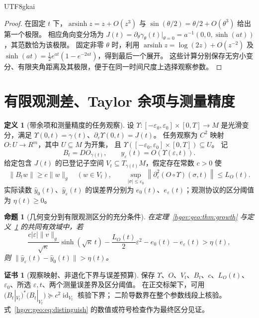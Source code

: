 \documentclass[12pt,a4paper,openany,notitlepage]{report}
\theoremstyle{plain}
\newtheorem{proposition}[theorem]{命题}
\theoremstyle{definition}
\newtheorem{definition}[theorem]{定义}
\newtheorem*{certificate}{证书}
\theoremstyle{remark}
\def\mathcal#1{#1}\def\mathsf#1{#1}\def\mathbb#1{#1}%
\begin{document}
\begin{CJK*}{UTF8}{gkai}
\begin{proof}
在固定 $t$ 下，$\operatorname{arsinh}z=z+O(z^3)$ 与
$\sin(\theta/2)=\theta/2+O(\theta^3)$ 给出第一个极限。
相应角向变分场为
$J(t)=\partial_\theta\gamma_\theta(t)|_{\theta=0}
=a^{-1}(0,0,\sinh(at))$，其范数恰为该极限。
固定非零 $\theta$ 时，利用
$\operatorname{arsinh}z=\log(2z)+O(z^{-2})$ 及
$\sinh(at)=\tfrac12e^{at}(1-e^{-2at})$，得到最后一个展开。
这些计算分别保存无穷小变分、有限夹角距离及其极限，便于在同一时间尺度上选择观察参数。
\end{proof}

\section{有限观测差、Taylor 余项与测量精度}
\label{exp:geo:section:finite-observation}

\begin{definition}[带余项和测量精度的任务观察]
\label{hgov:geo:def:observation}
设 $\Upsilon:[-\varepsilon_0,\varepsilon_0]\times[0,T]\to M$ 是光滑变分，满足
$\Upsilon(0,t)=\gamma(t)$、$\partial_\varepsilon\Upsilon(0,t)=J(t)$。
任务观察为 $C^2$ 映射 $\mathcal O:U\to\mathbb R^m$，其中 $U\subseteq M$ 为开集，
且 $\Upsilon([-\varepsilon_0,\varepsilon_0]\times[0,T])\subseteq U$。
记
\[
B_t=D\mathcal O_{\gamma(t)},\qquad
y_\varepsilon(t)=\mathcal O(\Upsilon(\varepsilon,t)).
\]
给定包含 $J(t)$ 的已登记子空间 $V_t\subseteq T_{\gamma(t)}M$，假定存在常数 $c>0$ 使
\[
\lVert B_tw\rVert\ge c\lVert w\rVert_g
\quad(w\in V_t),\qquad
\sup_{|\sigma|\le\varepsilon_0}
\left\lVert\partial_\varepsilon^2
(\mathcal O\circ\Upsilon)(\sigma,t)\right\rVert\le L_{\mathcal O}(t).
\]
实际读数 $\widehat y_0(t)$、$\widehat y_\varepsilon(t)$ 的误差界分别为
$e_0(t)$、$e_\varepsilon(t)$；观测协议的区分阈值为 $\eta(t)\ge0$。
\end{definition}

\begin{proposition}[几何变分到有限观测区分的充分条件]
\label{hgov:geo:prop:distinguish}
在定理~\ref{hgov:geo:thm:growth} 与定义~\ref{hgov:geo:def:observation} 的共同有效域中，若
\begin{equation}
\label{hgov:geo:eq:distinguish}
\frac{c|\varepsilon|\lVert v\rVert_g}{\sqrt\kappa}
\sinh(\sqrt\kappa\,t)
-\frac{L_{\mathcal O}(t)}2\varepsilon^2
-e_0(t)-e_\varepsilon(t)>\eta(t),
\end{equation}
则 $\lVert\widehat y_\varepsilon(t)-\widehat y_0(t)\rVert>\eta(t)$。
\end{proposition}

\begin{certificate}[观察映射、非退化下界与误差预算]
保存 $\Upsilon$、$\mathcal O$、$V_t$、$B_t$、$c$、$L_{\mathcal O}(t)$、
$\varepsilon_0$、所选 $\varepsilon,t$、两个测量误差界及区分阈值。
在正交标架下，可用
$\bigl(B_t|_{V_t}\bigr)^*\bigl(B_t|_{V_t}\bigr)\succeq c^2\operatorname{id}_{V_t}$ 核验下界；
二阶导数界在整个参数线段上核验。式~\eqref{hgov:geo:eq:distinguish} 的数值或符号检查作为最终区分见证。
\end{certificate}


\end{CJK*}
\end{document}
